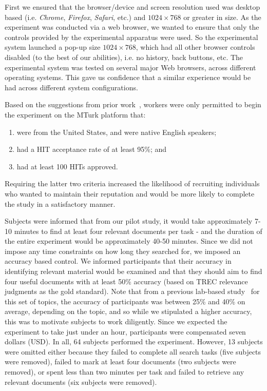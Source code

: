 First we ensured that the browser/device and screen resolution used was desktop based (i.e. \emph{Chrome}, \emph{Firefox}, \emph{Safari}, etc.) and $1024 \times 768$ or greater in size. As the experiment was conducted via a web browser, we wanted to ensure that only the controls provided by the experimental apparatus were used. So the experimental system launched a pop-up size $1024 \times 768$, which had all other browser controls disabled (to the best of our abilities), i.e. no history, back buttons, etc. The experimental system was tested on several major Web browsers, across different operating systems. This gave us confidence that a similar experience would be had across different system configurations.

Based on the suggestions from prior work~\cite{feild2010turkers,zuccon2013crowdsourcing,bota2016playing_your_cards}, workers were only permitted to begin the experiment on the MTurk platform that: 
\begin{enumerate}
\item were from the United States, and were native English speakers;
\item had a HIT acceptance rate of at least 95\%; and 
\item had at least 100 HITs approved.
\end{enumerate}
Requiring the latter two criteria increased the likelihood of recruiting individuals who wanted to maintain their reputation and would be more likely to complete the study in a satisfactory manner. 

Subjects were informed that from our pilot study, it would take approximately 7-10 minutes to find at least four relevant documents per task - and the duration of the entire experiment would be approximately 40-50 minutes. Since we did not impose any time constraints on how long they searched for, we imposed an accuracy based control. We informed participants that their accuracy in identifying relevant material would be examined and that they should aim to find four useful documents with at least 50\% accuracy (based on TREC relevance judgments as the gold standard). Note that from a previous lab-based study~\cite{maxwell2017snippet_length} for this set of topics, the accuracy of participants was between 25\% and 40\% on average, depending on the topic, and so while we stipulated a higher accuracy, this was to motivate subjects to work diligently. Since we expected the experiment to take just under an hour, participants were compensated seven dollars (USD). In all, 64 subjects performed the experiment. However, 13 subjects were omitted either because they failed to complete all search tasks (five subjects were removed), failed to mark at least four documents (two subjects were removed), or spent less than two minutes per task and failed to retrieve any relevant documents (six subjects were removed). 

